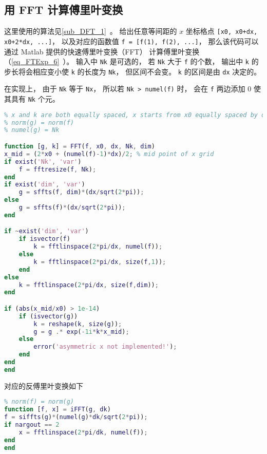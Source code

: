 \subsection{用 FFT 计算傅里叶变换}
这里使用的算法见\autoref{sub_DFT_1}~。 给出任意等间距的 $x$ 坐标格点 \verb|[x0, x0+dx, x0+2*dx, ...]|， 以及对应的函数值 \verb|f = [f(1), f(2), ...]|， 那么该代码可以通过 Matlab 提供的快速傅里叶变换（FFT） 计算傅里叶变换（\autoref{eq_FTExp_6}~）。 输入中 \verb|Nk| 是可选的， 若 \verb|Nk| 大于 \verb|f| 的个数， 输出中 \verb|k| 的步长将会相应变小使 \verb|k| 的长度为 \verb|Nk|， 但区间不会变。 \verb|k| 的区间是由 \verb|dx| 决定的。

在实现上， 由于 \verb|Nk| 等于 \verb|Nx|， 所以若 \verb|Nk > numel(f)| 时， 会在 \verb|f| 两边添加 0 使其具有 \verb|Nk| 个元。
\begin{lstlisting}[language=matlab, caption=FFT.m]
% fft approximation of the analytical fourier transform from f(x) to g(k)
% x and k are both equally spaced, x starts from x0 equally spaced by dx
% norm(g) = norm(f)
% numel(g) = Nk

function [g, k] = FFT(f, x0, dx, Nk, dim)
x_mid = (2*x0 + (numel(f)-1)*dx)/2; % mid point of x grid
if exist('Nk', 'var')
    f = fftresize(f, Nk);
end
if exist('dim', 'var')
    g = sffts(f, dim)*(dx/sqrt(2*pi));
else
    g = sffts(f)*(dx/sqrt(2*pi));
end

if ~exist('dim', 'var')
    if isvector(f)
        k = fftlinspace(2*pi/dx, numel(f));
    else
        k = fftlinspace(2*pi/dx, size(f,1));
    end
else
    k = fftlinspace(2*pi/dx, size(f,dim));
end

if (abs(x_mid/x0) > 1e-14)
    if (isvector(g))
        k = reshape(k, size(g));
        g = g .* exp(-1i*k*x_mid);
    else
        error('asymmetric x not implemented!');
    end
end
end
\end{lstlisting}
对应的反傅里叶变换如下
\begin{lstlisting}[language=matlab, caption=iFFT.m]
% fft approximation of the analytical inverse fourier transform
% norm(f) = norm(g)
function [f, x] = iFFT(g, dk)
f = siffts(g)*(numel(g)*dk/sqrt(2*pi));
if nargout == 2
    x = fftlinspace(2*pi/dk, numel(f));
end
end
\end{lstlisting}

